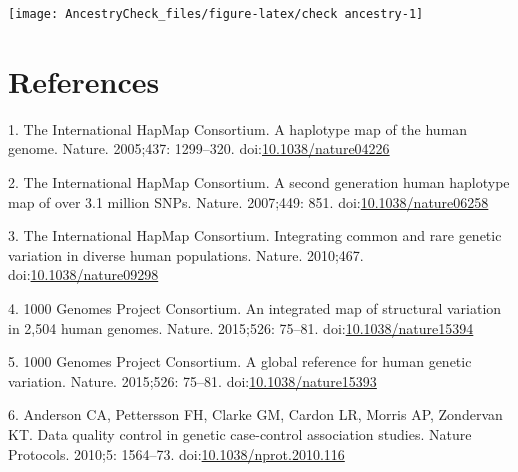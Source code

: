 \documentclass[]{article}
\begin{document}
\begin{center}\texttt{[image: AncestryCheck\_files/figure-latex/check ancestry-1]} \end{center}

\section*{References}\label{references}

\hypertarget{refs}{}
\hypertarget{ref-HapMap2005}{}
1. The International HapMap Consortium. A haplotype map of the human
genome. Nature. 2005;437: 1299--320.
doi:\href{https://doi.org/10.1038/nature04226}{10.1038/nature04226}

\hypertarget{ref-HapMap2007}{}
2. The International HapMap Consortium. A second generation human
haplotype map of over 3.1 million SNPs. Nature. 2007;449: 851.
doi:\href{https://doi.org/10.1038/nature06258}{10.1038/nature06258}

\hypertarget{ref-HapMap2010}{}
3. The International HapMap Consortium. Integrating common and rare
genetic variation in diverse human populations. Nature. 2010;467.
doi:\href{https://doi.org/10.1038/nature09298}{10.1038/nature09298}

\hypertarget{ref-a1000Genomes2015}{}
4. 1000 Genomes Project Consortium. An integrated map of structural
variation in 2,504 human genomes. Nature. 2015;526: 75--81.
doi:\href{https://doi.org/10.1038/nature15394}{10.1038/nature15394}

\hypertarget{ref-b1000Genomes2015}{}
5. 1000 Genomes Project Consortium. A global reference for human genetic
variation. Nature. 2015;526: 75--81.
doi:\href{https://doi.org/10.1038/nature15393}{10.1038/nature15393}

\hypertarget{ref-Anderson2010}{}
6. Anderson CA, Pettersson FH, Clarke GM, Cardon LR, Morris AP,
Zondervan KT. Data quality control in genetic case-control association
studies. Nature Protocols. 2010;5: 1564--73.
doi:\href{https://doi.org/10.1038/nprot.2010.116}{10.1038/nprot.2010.116}
\end{document}
